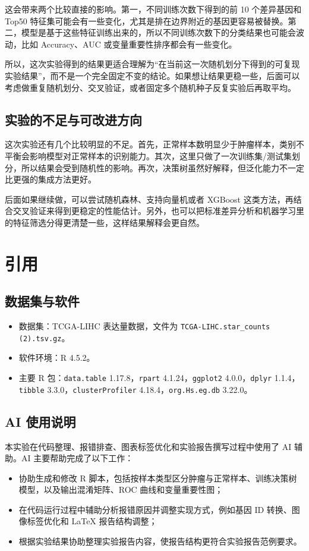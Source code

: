 \documentclass[12pt,fontset=fandol]{ctexart}
\begin{document}
这会带来两个比较直接的影响。第一，不同训练次数下得到的前 10 个差异基因和 Top50 特征集可能会有一些变化，尤其是排在边界附近的基因更容易被替换。第二，模型是基于这些特征训练出来的，所以不同训练次数下的分类结果也可能会波动，比如 Accuracy、AUC 或变量重要性排序都会有一些变化。

所以，这次实验得到的结果更适合理解为“在当前这一次随机划分下得到的可复现实验结果”，而不是一个完全固定不变的结论。如果想让结果更稳一些，后面可以考虑做重复随机划分、交叉验证，或者固定多个随机种子反复实验后再取平均。

\subsection{实验的不足与可改进方向}
这次实验还有几个比较明显的不足。首先，正常样本数明显少于肿瘤样本，类别不平衡会影响模型对正常样本的识别能力。其次，这里只做了一次训练集/测试集划分，所以结果会受到随机性的影响。再次，决策树虽然好解释，但泛化能力不一定比更强的集成方法更好。

后面如果继续做，可以尝试随机森林、支持向量机或者 XGBoost 这类方法，再结合交叉验证来得到更稳定的性能估计。另外，也可以把标准差异分析和机器学习里的特征筛选分得更清楚一些，这样结果解释会更自然。

\section{引用}
\subsection{数据集与软件}
\begin{itemize}
  \item 数据集：TCGA-LIHC 表达量数据，文件为 \texttt{TCGA-LIHC.star\_counts (2).tsv.gz}。
  \item 软件环境：R 4.5.2。
  \item 主要 R 包：\texttt{data.table} 1.17.8，\texttt{rpart} 4.1.24，\texttt{ggplot2} 4.0.0，\texttt{dplyr} 1.1.4，\texttt{tibble} 3.3.0，\texttt{clusterProfiler} 4.18.4，\texttt{org.Hs.eg.db} 3.22.0。
\end{itemize}

\subsection{AI 使用说明}
本实验在代码整理、报错排查、图表标签优化和实验报告撰写过程中使用了 AI 辅助。AI 主要帮助完成了以下工作：
\begin{itemize}
  \item 协助生成和修改 R 脚本，包括按样本类型区分肿瘤与正常样本、训练决策树模型，以及输出混淆矩阵、ROC 曲线和变量重要性图；
  \item 在代码运行过程中辅助分析报错原因并调整实现方式，例如基因 ID 转换、图像标签优化和 LaTeX 报告结构调整；
  \item 根据实验结果协助整理实验报告内容，使报告结构更符合实验报告范例要求。
\end{itemize}
\end{document}
